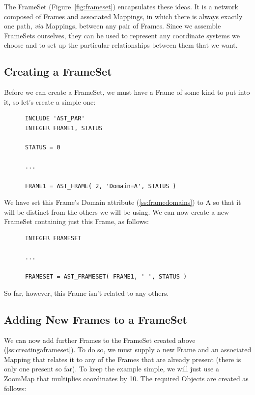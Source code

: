 \documentclass[twoside,11pt]{article}
\newcommand{\htmlref}[2]{#1}
\newcommand{\secref}[1]{\S\ref{#1}}
\renewcommand{\secref}[1]{\ref{#1}}
\begin{document}
The \htmlref{FrameSet}{FrameSet} (Figure~\ref{fig:frameset}) encapsulates these ideas.  It
is a network composed of Frames and associated Mappings, in which
there is always exactly one path, {\em{via}} Mappings, between any
pair of Frames.  Since we assemble FrameSets ourselves, they can be
used to represent any coordinate systems we choose and to set up the
particular relationships between them that we want.

\subsection{\label{ss:creatingaframeset}Creating a FrameSet}

Before we can create a \htmlref{FrameSet}{FrameSet}, we must have a \htmlref{Frame}{Frame} of some kind to
put into it, so let's create a simple one:

\small
\begin{verbatim}
      INCLUDE 'AST_PAR'
      INTEGER FRAME1, STATUS

      STATUS = 0

      ...

      FRAME1 = AST_FRAME( 2, 'Domain=A', STATUS )
\end{verbatim}
\normalsize

We have set this Frame's \htmlref{Domain}{Domain} attribute (\secref{ss:framedomains}) to
A so that it will be distinct from the others we will be using. We can
now create a new FrameSet containing just this Frame, as follows:

\small
\begin{verbatim}
      INTEGER FRAMESET

      ...

      FRAMESET = AST_FRAMESET( FRAME1, ' ', STATUS )
\end{verbatim}
\normalsize

So far, however, this Frame isn't related to any others.

\subsection{\label{ss:addingframes}Adding New Frames to a FrameSet}

We can now add further Frames to the \htmlref{FrameSet}{FrameSet} created above
(\secref{ss:creatingaframeset}). To do so, we must supply a new \htmlref{Frame}{Frame}
and an associated \htmlref{Mapping}{Mapping} that relates it to any of the Frames that
are already present (there is only one present so far).  To keep the
example simple, we will just use a \htmlref{ZoomMap}{ZoomMap} that multiplies coordinates
by 10. The required Objects are created as follows:
\end{document}
